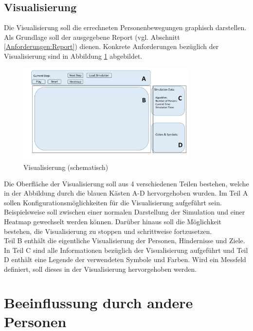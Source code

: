 \subsection{Visualisierung}

Die Visualisierung soll die errechneten Personenbewegungen graphisch darstellen. Als Grundlage soll der ausgegebene Report (vgl. Abschnitt \ref{Anforderungen:Report}) dienen. Konkrete Anforderungen bezüglich der Visualisierung sind in Abbildung \ref{fig:AnforderungenVisualisierung} abgebildet.

\begin{figure}[htpb]
	\centering
	\includegraphics[width=0.8\textwidth]{abbildungen/AnforderungenVisualisierung.pdf}
	\caption{Visualisierung (schematisch)}
	\label{fig:AnforderungenVisualisierung}
\end{figure}

Die Oberfläche der Visualisierung soll aus 4 verschiedenen Teilen bestehen, welche in der Abbildung durch die blauen Kästen A-D hervorgehoben wurden. Im Teil A sollen Konfigurationsmöglichkeiten für die Visualisierung aufgeführt sein. Beispielsweise soll zwischen einer normalen Darstellung der Simulation und einer Heatmap gewechselt werden können. Darüber hinaus soll die Möglichkeit bestehen, die Visualisierung zu stoppen und schrittweise fortzusetzen. \\
Teil B enthält die eigentliche Visualisierung der Personen, Hindernisse und Ziele. In Teil C sind alle Informationen bezüglich der Visualisierung aufgeführt und Teil D enthält eine Legende der verwendeten Symbole und Farben. Wird ein Messfeld definiert, soll dieses in der Visualisierung hervorgehoben werden.


\section{Beeinflussung durch andere Personen} 
\label{Personenpotenzial}

